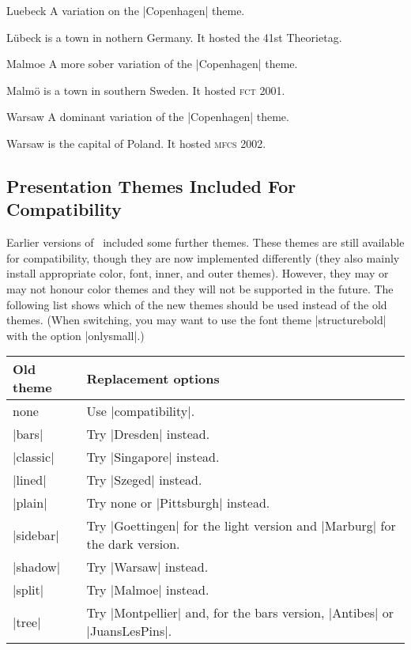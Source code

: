 \begin{themeexample}{Luebeck}
  A variation on the |Copenhagen| theme.

  L\"ubeck is a town in nothern Germany. It hosted the 41st Theorietag.
\end{themeexample}

\begin{themeexample}{Malmoe}
  A more sober variation of the |Copenhagen| theme.

  Malm\"o is a town in southern Sweden. It hosted \textsc{fct} 2001.
\end{themeexample}

\begin{themeexample}{Warsaw}
  A dominant variation of the |Copenhagen| theme.

  Warsaw is the capital of Poland. It hosted \textsc{mfcs} 2002.
\end{themeexample}


\subsection{Presentation Themes Included For Compatibility}

Earlier versions of \beamer\ included some further themes. These themes are still available for compatibility, though they are now implemented differently (they also mainly install appropriate color, font, inner, and outer themes). However, they may or may not honour color themes and they will not be supported in the future. The following list shows which of the new themes should be used instead of the old themes. (When switching, you may want to use the font theme |structurebold| with the option |onlysmall|.)

\medskip
\begin{tabular}{lp{13cm}}
  Old theme & Replacement options \\\hline
  none & Use |compatibility|. \\
  |bars| & Try |Dresden| instead. \\
  |classic| & Try |Singapore| instead. \\
  |lined| & Try |Szeged| instead. \\
  |plain| & Try none or |Pittsburgh| instead. \\
  |sidebar| & Try |Goettingen| for the light version and |Marburg| for
  the dark version. \\
  |shadow| & Try |Warsaw| instead. \\
  |split| & Try |Malmoe| instead. \\
  |tree| & Try |Montpellier| and, for the bars version, |Antibes| or
  |JuansLesPins|.
\end{tabular}
